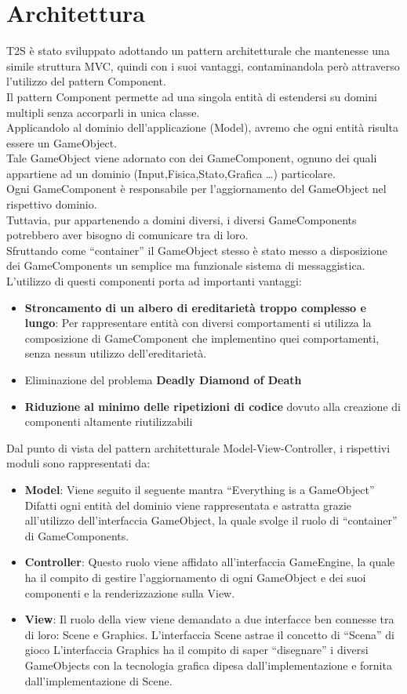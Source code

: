 \documentclass[a4paper,12pt]{report}
\begin{document}
\section{Architettura}
T2S è stato sviluppato adottando un pattern architetturale che mantenesse una simile struttura MVC, quindi con i suoi vantaggi, contaminandola però attraverso l’utilizzo del pattern Component.
\\
Il pattern Component permette ad una singola entità di estendersi su domini multipli senza accorparli in unica classe.
\\
Applicandolo al dominio dell’applicazione (Model), avremo che ogni entità risulta essere un GameObject.
\\
Tale GameObject viene adornato con dei GameComponent, ognuno dei quali appartiene ad un dominio (Input,Fisica,Stato,Grafica …) particolare.
\\
Ogni GameComponent è responsabile per l’aggiornamento del GameObject nel rispettivo dominio.
\\
Tuttavia, pur appartenendo a domini diversi, i diversi GameComponents potrebbero aver bisogno di comunicare tra di loro.
\\
Sfruttando come “container” il GameObject stesso è stato messo a disposizione dei GameComponents un semplice ma funzionale sistema di messaggistica.
\\
L’utilizzo di questi componenti porta ad importanti vantaggi:
\begin{itemize}
	\item \textbf{Stroncamento di un albero di ereditarietà troppo complesso e lungo}:
	Per rappresentare entità con diversi comportamenti si utilizza la composizione di GameComponent che implementino quei comportamenti, senza nessun utilizzo dell’ereditarietà.
	\item Eliminazione del problema \textbf{Deadly Diamond of Death}
	\item \textbf{Riduzione al minimo delle ripetizioni di codice} dovuto alla creazione di componenti altamente riutilizzabili
\end{itemize}
Dal punto di vista del pattern architetturale Model-View-Controller, i rispettivi moduli sono rappresentati da:
\begin{itemize}
	\item \textbf{Model}:
	Viene seguito il seguente mantra “Everything is a GameObject”		
Difatti ogni entità del dominio viene rappresentata e astratta grazie all’utilizzo 	dell’interfaccia GameObject, la quale svolge il ruolo di “container” di GameComponents.
	\item \textbf{Controller}:
 Questo ruolo viene affidato all’interfaccia GameEngine, la quale ha il compito di gestire l’aggiornamento di ogni GameObject e dei suoi componenti e la renderizzazione sulla View.
	\item \textbf{View}:
 Il ruolo della view viene demandato a due interfacce ben connesse tra di loro: Scene  e Graphics.
L’interfaccia Scene astrae il concetto di “Scena” di gioco
L’interfaccia Graphics ha il compito di saper “disegnare” i diversi GameObjects con la 
tecnologia grafica dipesa dall’implementazione e fornita dall'implementazione di Scene.
\end{itemize}
\end{document}
